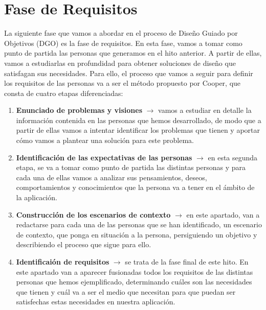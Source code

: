 \section{Fase de Requisitos}
La siguiente fase que vamos a abordar en el proceso de Diseño Guiado por Objetivos (DGO) es la fase de requisitos. En esta fase, vamos a tomar como punto de partida las personas que generamos en el hito anterior. A partir de ellas, vamos a estudiarlas en profundidad para obtener soluciones de diseño que satisfagan sus necesidades. Para ello, el proceso que vamos a seguir para definir los requisitos de las personas va a ser el método propuesto por Cooper, que consta de cuatro etapas diferenciadas:
\begin{enumerate}
	\item \textbf{Enunciado de problemas y visiones} $\rightarrow$ vamos a estudiar en detalle la información contenida en las personas que hemos desarrollado, 
    de modo que a partir de ellas vamos a intentar identificar los problemas que tienen y aportar cómo vamos a plantear una solución para este problema.
    \item \textbf{Identificación de las expectativas de las personas} $\rightarrow$ en esta segunda etapa, se va a tomar como punto de partida las distintas personas
    y para cada una de ellas vamos a analizar sus pensamientos, deseos, comportamientos y conocimientos que la persona va a tener en el ámbito de la aplicación.
    \item \textbf{Construcción de los escenarios de contexto} $\rightarrow$ en este apartado, van a redactarse para cada una de las personas que se han identificado, un
    escenario de contexto, que ponga en situación a la persona, persiguiendo un objetivo y describiendo el proceso que sigue para ello.
    \item \textbf{Identificaión de requisitos} $\rightarrow$ se trata de la fase final de este hito. En este apartado van a aparecer fusionadas todos los requisitos de
    las distintas personas que hemos ejemplificado, determinando cuáles son las necesidades que tienen y cuál va a ser el medio que necesitan para que puedan ser
    satisfechas estas necesidades en nuestra aplicación.
\end{enumerate}

